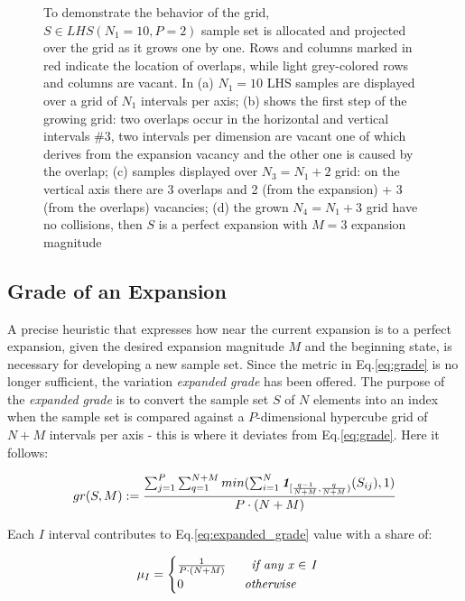\documentclass[12pt]{extarticle}
\newcommand{\meqref}[1]{Eq.\ref{#1}}
\newcommand{\indfunc}[1]{\textit{\textbf{1}}_{#1}}
\begin{document}
\begin{figure}[]
    \caption{To demonstrate the behavior of the grid, $S \in LHS(N_1 = 10, P = 2)$ sample set is allocated and projected over the grid as it grows one by one. Rows and columns marked in red indicate the location of overlaps, while light grey-colored rows and columns are vacant. In (a) $N_1 = 10$ LHS samples are displayed over a grid of $N_1$ intervals per axis; (b) shows the first step of the growing grid: two overlaps occur in the horizontal and vertical intervals \#3, two intervals per dimension are vacant one of which derives from the expansion vacancy and the other one is caused by the overlap; (c) samples displayed over $N_3 = N_1 + 2$ grid: on the vertical axis there are 3 overlaps and 2 (from the expansion) + 3 (from the overlaps) vacancies; (d) the grown $N_4 = N_1 + 3$ grid have no collisions, then $S$ is a perfect expansion with $M = 3$ expansion magnitude}
    \label{fig:example_overlaps}
\end{figure}


\subsection{Grade of an Expansion}
\label{subsec:expansion_grade}
A precise heuristic that expresses how near the current expansion is to a perfect expansion, given the desired expansion magnitude $M$ and the beginning state, is necessary for developing a new sample set. Since the metric in \meqref{eq:grade} is no longer sufficient, the variation \textit{expanded grade} has been offered.
The purpose of the \textit{expanded grade} is to convert the sample set $S$ of $N$ elements into an index when the sample set is compared against a $P$-dimensional hypercube grid of $N+M$ intervals per axis - this is where it deviates from \meqref{eq:grade}. Here it follows:

\begin{equation}
\label{eq:expanded_grade}
gr(S, M) := \frac{\sum^P_{j=1}\sum^{N + M}_{q=1} min(\sum^N_{i=1}\indfunc{[\frac{q-1}{N + M}, \frac{q}{N + M})}(S_{ij}), 1)}{P \cdot (N + M)}
\end{equation}

Each $I$ interval contributes to \meqref{eq:expanded_grade} value with a share of:

\begin{equation}
\label{eq:single_contribute_interval}
\mu_I = 
\begin{cases}
\frac{1}{P \cdot (N+M)} \qquad \text{\textit{if any x $\in$ I}}\\
0 \qquad\qquad\;\;\; \text{\textit{otherwise}}
\end{cases}
\end{equation}
\end{document}
